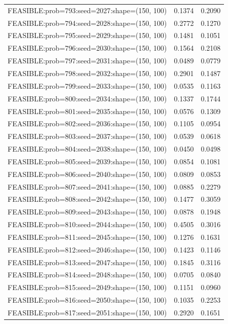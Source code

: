 \begin{longtable}{lcc}
FEASIBLE:prob=793:seed=2027:shape=(150, 100) &   0.1374 & 0.2090 \\
FEASIBLE:prob=794:seed=2028:shape=(150, 100) &   0.2772 & 0.1270 \\
FEASIBLE:prob=795:seed=2029:shape=(150, 100) &   0.1481 & 0.1051 \\
FEASIBLE:prob=796:seed=2030:shape=(150, 100) &   0.1564 & 0.2108 \\
FEASIBLE:prob=797:seed=2031:shape=(150, 100) &   0.0489 & 0.0779 \\
FEASIBLE:prob=798:seed=2032:shape=(150, 100) &   0.2901 & 0.1487 \\
FEASIBLE:prob=799:seed=2033:shape=(150, 100) &   0.0535 & 0.1163 \\
FEASIBLE:prob=800:seed=2034:shape=(150, 100) &   0.1337 & 0.1744 \\
FEASIBLE:prob=801:seed=2035:shape=(150, 100) &   0.0576 & 0.1309 \\
FEASIBLE:prob=802:seed=2036:shape=(150, 100) &   0.1105 & 0.0954 \\
FEASIBLE:prob=803:seed=2037:shape=(150, 100) &   0.0539 & 0.0618 \\
FEASIBLE:prob=804:seed=2038:shape=(150, 100) &   0.0450 & 0.0498 \\
FEASIBLE:prob=805:seed=2039:shape=(150, 100) &   0.0854 & 0.1081 \\
FEASIBLE:prob=806:seed=2040:shape=(150, 100) &   0.0809 & 0.0853 \\
FEASIBLE:prob=807:seed=2041:shape=(150, 100) &   0.0885 & 0.2279 \\
FEASIBLE:prob=808:seed=2042:shape=(150, 100) &   0.1477 & 0.3059 \\
FEASIBLE:prob=809:seed=2043:shape=(150, 100) &   0.0878 & 0.1948 \\
FEASIBLE:prob=810:seed=2044:shape=(150, 100) &   0.4505 & 0.3016 \\
FEASIBLE:prob=811:seed=2045:shape=(150, 100) &   0.1276 & 0.1631 \\
FEASIBLE:prob=812:seed=2046:shape=(150, 100) &   0.1423 & 0.1146 \\
FEASIBLE:prob=813:seed=2047:shape=(150, 100) &   0.1845 & 0.3116 \\
FEASIBLE:prob=814:seed=2048:shape=(150, 100) &   0.0705 & 0.0840 \\
FEASIBLE:prob=815:seed=2049:shape=(150, 100) &   0.1151 & 0.0960 \\
FEASIBLE:prob=816:seed=2050:shape=(150, 100) &   0.1035 & 0.2253 \\
FEASIBLE:prob=817:seed=2051:shape=(150, 100) &   0.2920 & 0.1651 \\

\end{longtable}
